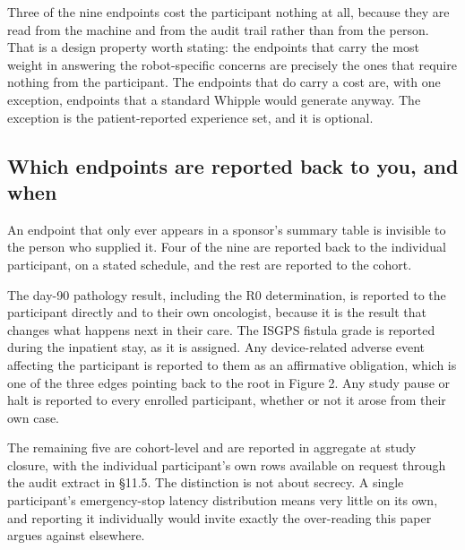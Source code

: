 \vspace{0.30em}

\noindent Three of the nine endpoints cost the participant nothing at all,
because they are read from the machine and from the audit trail rather than from
the person. That is a design property worth stating: the endpoints that carry
the most weight in answering the robot-specific concerns are precisely the ones
that require nothing from the participant. The endpoints that do carry a cost
are, with one exception, endpoints that a standard Whipple would generate
anyway. The exception is the patient-reported experience set, and it is
optional.

\subsection{Which endpoints are reported back to you, and when}

An endpoint that only ever appears in a sponsor's summary table is invisible to
the person who supplied it. Four of the nine are reported back to the individual
participant, on a stated schedule, and the rest are reported to the cohort.

The day-90 pathology result, including the R0 determination, is reported to the
participant directly and to their own oncologist, because it is the result that
changes what happens next in their care. The ISGPS fistula grade is reported
during the inpatient stay, as it is assigned. Any device-related adverse event
affecting the participant is reported to them as an affirmative obligation,
which is one of the three edges pointing back to the root in Figure 2. Any study
pause or halt is reported to every enrolled participant, whether or not it arose
from their own case.

The remaining five are cohort-level and are reported in aggregate at study
closure, with the individual participant's own rows available on request through
the audit extract in \S 11.5. The distinction is not about secrecy. A single
participant's emergency-stop latency distribution means very little on its own,
and reporting it individually would invite exactly the over-reading this paper
argues against elsewhere.
